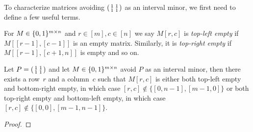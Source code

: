 To characterize matrices avoiding $\left(\begin{smallmatrix}1&1\\1&1\end{smallmatrix}\right)$ as an interval minor, we first need to define a few useful terms.
\begin{defn}
For $M\in\{0,1\}^{m\times n}$ and $r\in[m],c\in[n]$ we say $M[r,c]$ is \emph{top-left empty} if $M[[r-1],[c-1]]$ is an empty matrix. Similarly, it is \emph{top-right empty} if $M[[r-1],[c+1,n]]$ is empty and so on.
\end{defn}
\begin{lemma}
\label{lemma1}
Let $P=\left(\begin{smallmatrix}1&1\\1&1\end{smallmatrix}\right)$ and let $M\in\{0,1\}^{m\times n}$ avoid $P$ as an interval minor, then there exists a row~$r$ and a column~$c$ such that $M[r,c]$ is either both top-left empty and bottom-right empty, in which case $[r,c]\not\in\{[0,n-1],[m-1,0]\}$ or both top-right empty and bottom-left empty, in which case $[r,c]\not\in\{[0,0],[m-1,n-1]\}$.
\end{lemma}
\begin{proof}

\end{proof}

